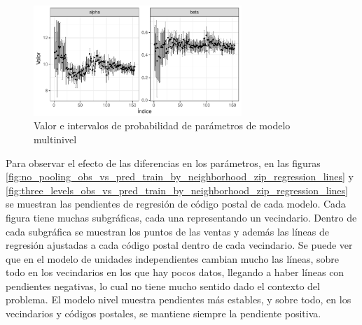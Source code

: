 \begin{figure}[H]
    \centering
    \includegraphics[width=0.7\textwidth]{images/three_levels_param_values.pdf}
    \caption{Valor e intervalos de probabilidad de parámetros de modelo multinivel}
    \label{fig:three_levels_param_values}
\end{figure}

Para observar el efecto de las diferencias en los parámetros, en las figuras \ref{fig:no_pooling_obs_vs_pred_train_by_neighborhood_zip_regression_lines} y \ref{fig:three_levels_obs_vs_pred_train_by_neighborhood_zip_regression_lines} se muestran las pendientes de regresión de código postal de cada modelo. Cada figura tiene muchas subgráficas, cada una representando un vecindario. Dentro de cada subgráfica se muestran los puntos de las ventas y además las líneas de regresión ajustadas a cada código postal dentro de cada vecindario. Se puede ver que en el modelo de unidades independientes cambian mucho las líneas, sobre todo en los vecindarios en los que hay pocos datos, llegando a haber líneas con pendientes negativas, lo cual no tiene mucho sentido dado el contexto del problema. El modelo nivel muestra pendientes más estables, y sobre todo, en los vecindarios y códigos postales, se mantiene siempre la pendiente positiva.

